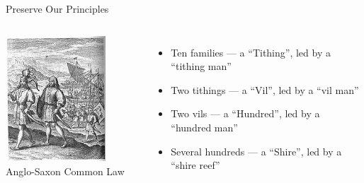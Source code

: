 \begin{frame}{Preserve Our Principles}
    \begin{columns}[onlytextwidth]
            \centering
            \includegraphics[width=0.75\textwidth]{img/hengist-horsa.png} \\
            Anglo-Saxon Common Law \color{red}\\

            \begin{itemize}
                \item Ten families --- a ``Tithing'', led by a ``tithing man''
                \item Two tithings --- a ``Vil'', led by a ``vil man''
                \item Two vils --- a ``Hundred'', led by a ``hundred man''
                \item Several hundreds --- a ``Shire'', led by a ``shire reef''
            \end{itemize}
    \end{columns}
\end{frame}

